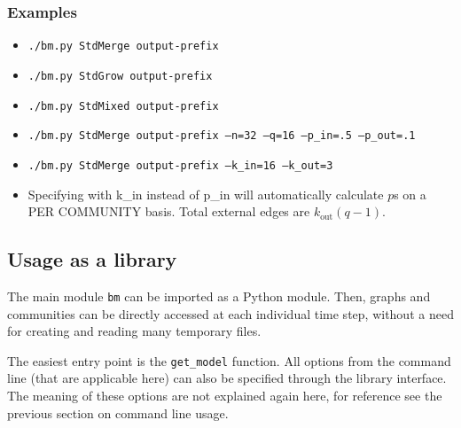 \documentclass{article}
\def\out{\mathrm{out}}
\begin{document}
\subsubsection{Examples}

\begin{itemize}
\item \texttt{./bm.py StdMerge output-prefix}
\item \texttt{./bm.py StdGrow output-prefix}
\item \texttt{./bm.py StdMixed output-prefix}
\item \texttt{./bm.py StdMerge output-prefix --n=32 --q=16 --p\_in=.5 --p\_out=.1}
\item \texttt{./bm.py StdMerge output-prefix --k\_in=16 --k\_out=3}
\item Specifying with k\_in instead of p\_in will automatically
  calculate $p$s on a PER COMMUNITY basis.  Total external edges are $k_\out(q-1)$.
\end{itemize}



\subsection{Usage as a library}
\label{sec:use-library}


The main module \texttt{bm} can be imported as a Python module.  Then,
graphs and communities can be directly accessed at each individual
time step, without a need for creating and reading many temporary
files.

The easiest entry point is the \texttt{get\_model} function.  All
options from the command line (that are applicable here) can also be
specified through the library interface.  The meaning of these options
are not explained again here, for reference see the previous section
on command line usage.
\end{document}
